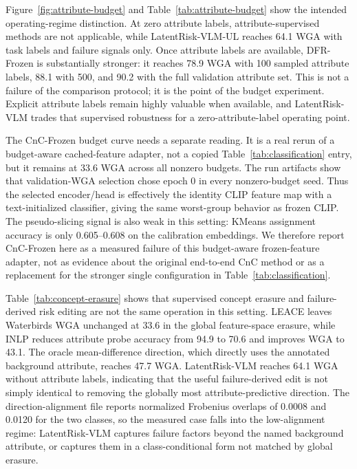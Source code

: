 Figure~\ref{fig:attribute-budget} and Table~\ref{tab:attribute-budget} show the intended operating-regime distinction. At zero attribute labels, attribute-supervised methods are not applicable, while LatentRisk-VLM-UL reaches 64.1 WGA with task labels and failure signals only. Once attribute labels are available, DFR-Frozen is substantially stronger: it reaches 78.9 WGA with 100 sampled attribute labels, 88.1 with 500, and 90.2 with the full validation attribute set. This is not a failure of the comparison protocol; it is the point of the budget experiment. Explicit attribute labels remain highly valuable when available, and LatentRisk-VLM trades that supervised robustness for a zero-attribute-label operating point.

The CnC-Frozen budget curve needs a separate reading. It is a real rerun of a budget-aware cached-feature adapter, not a copied Table~\ref{tab:classification} entry, but it remains at 33.6 WGA across all nonzero budgets. The run artifacts show that validation-WGA selection chose epoch 0 in every nonzero-budget seed. Thus the selected encoder/head is effectively the identity CLIP feature map with a text-initialized classifier, giving the same worst-group behavior as frozen CLIP. The pseudo-slicing signal is also weak in this setting: KMeans assignment accuracy is only 0.605--0.608 on the calibration embeddings. We therefore report CnC-Frozen here as a measured failure of this budget-aware frozen-feature adapter, not as evidence about the original end-to-end CnC method or as a replacement for the stronger single configuration in Table~\ref{tab:classification}.

\begin{table}[t]
\centering
\caption{Waterbirds concept-erasure comparison on cached CLIP features. LEACE/INLP use attribute labels to learn a global erasure direction. LatentRisk-VLM uses task labels and failure signals instead. Attribute-probe accuracy is measured after editing; n/a means that the corresponding probe was not defined by the LatentRisk artifact rather than filled with an assumed value.}
\label{tab:concept-erasure}
\small
\setlength{\tabcolsep}{4.0pt}

\end{table}

Table~\ref{tab:concept-erasure} shows that supervised concept erasure and failure-derived risk editing are not the same operation in this setting. LEACE leaves Waterbirds WGA unchanged at 33.6 in the global feature-space erasure, while INLP reduces attribute probe accuracy from 94.9 to 70.6 and improves WGA to 43.1. The oracle mean-difference direction, which directly uses the annotated background attribute, reaches 47.7 WGA. LatentRisk-VLM reaches 64.1 WGA without attribute labels, indicating that the useful failure-derived edit is not simply identical to removing the globally most attribute-predictive direction. The direction-alignment file reports normalized Frobenius overlaps of 0.0008 and 0.0120 for the two classes, so the measured case falls into the low-alignment regime: LatentRisk-VLM captures failure factors beyond the named background attribute, or captures them in a class-conditional form not matched by global erasure.

